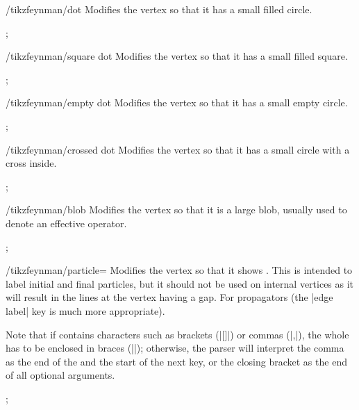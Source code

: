 \documentclass[a4paper,final]{ltxdoc}
\begin{document}
\begin{key}{/tikzfeynman/dot}
  Modifies the vertex so that it has a small filled circle.

\begin{codeexample}[]
;
\end{codeexample}
\end{key}

\begin{key}{/tikzfeynman/square dot}
  Modifies the vertex so that it has a small filled square.

\begin{codeexample}[]
;
\end{codeexample}
\end{key}

\begin{key}{/tikzfeynman/empty dot}
  Modifies the vertex so that it has a small empty circle.

\begin{codeexample}[]
;
\end{codeexample}
\end{key}

\begin{key}{/tikzfeynman/crossed dot}
  Modifies the vertex so that it has a small circle with a cross inside.

\begin{codeexample}[]
;
\end{codeexample}
\end{key}

\begin{key}{/tikzfeynman/blob}
  Modifies the vertex so that it is a large blob, usually used to denote an
  effective operator.

\begin{codeexample}[]
;
\end{codeexample}
\end{key}

\begin{key}{/tikzfeynman/particle=}
  Modifies the vertex so that it shows .  This is intended to label
  initial and final particles, but it should not be used on internal vertices as
  it will result in the lines at the vertex having a gap.  For propagators (the
  |edge label| key is much more appropriate).

  Note that if  contains characters such as brackets (|[]|) or
  commas (|,|), the whole  has to be enclosed in braces (|{}|);
  otherwise, the parser will interpret the comma as the end of the 
  and the start of the next key, or the closing bracket as the end of all
  optional arguments.

\begin{codeexample}[]
;
\end{codeexample}
\end{key}
\end{document}
